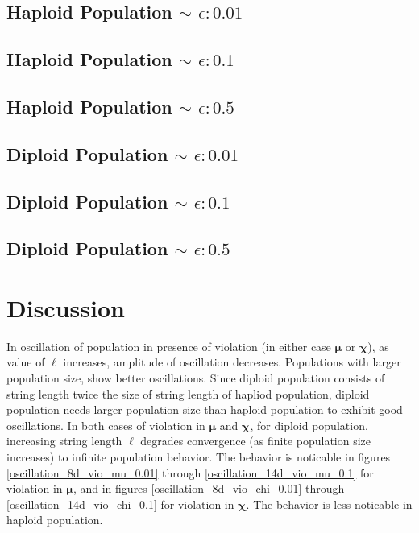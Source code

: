 \subsection{Haploid Population $\mathtt{\sim}$ $\epsilon: 0.01$}

\subsection{Haploid Population $\mathtt{\sim}$ $\epsilon: 0.1$}

\subsection{Haploid Population $\mathtt{\sim}$ $\epsilon: 0.5$}


\subsection{Diploid Population $\mathtt{\sim}$ $\epsilon: 0.01$}

\subsection{Diploid Population $\mathtt{\sim}$ $\epsilon: 0.1$}

\subsection{Diploid Population $\mathtt{\sim}$ $\epsilon: 0.5$}


\section{Discussion}

In oscillation of population in presence of violation (in either case $\bm{\mu}$ or $\bm{\chi}$), 
as value of $\ell$ increases, amplitude of oscillation decreases. 
Populations with larger population size, show better oscillations. 
Since diploid population consists of string length twice the size of string length of hapliod population, 
diploid population needs larger population size than haploid population to exhibit good oscillations. 
In both cases of violation in $\bm{\mu}$ and $\bm{\chi}$, for diploid population, increasing string length $\ell$ 
degrades convergence (as finite population size increases) to infinite population behavior. The behavior is noticable in figures 
\ref{oscillation_8d_vio_mu_0.01} through \ref{oscillation_14d_vio_mu_0.1} for violation in $\bm{\mu}$, 
and in figures \ref{oscillation_8d_vio_chi_0.01} through \ref{oscillation_14d_vio_chi_0.1} for violation in $\bm{\chi}$. 
The behavior is less noticable in haploid population.

